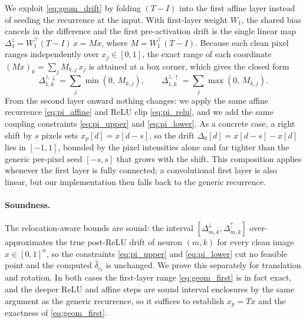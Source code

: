 \documentclass[11pt]{article}
\begin{document}
We exploit \eqref{eq:geom_drift} by folding $(T-I)$ into the first affine layer instead of seeding the recurrence at the input. With first-layer weight $W_1$, the shared bias cancels in the difference and the first pre-activation drift is the single linear map $\Delta^{z}_{1} = W_1^\top (T-I)\, x = M x$, where $M = W_1^\top (T-I)$. Because each clean pixel ranges independently over $x_j \in [0,1]$, the exact range of each coordinate $(Mx)_k = \sum_j M_{k,j}\, x_j$ is attained at a box corner, which gives the closed form
\begin{equation}
  \Delta^{z,\downarrow}_{1,k} = \textstyle\sum_j \min(0,\, M_{k,j}), \qquad
  \Delta^{z,\uparrow}_{1,k}   = \textstyle\sum_j \max(0,\, M_{k,j}).
  \label{eq:geom_first}
\end{equation}
From the second layer onward nothing changes: we apply the same affine recurrence \eqref{eq:pi_affine} and ReLU clip \eqref{eq:pi_relu}, and we add the same coupling constraints \eqref{eq:pi_upper} and \eqref{eq:pi_lower}. As a concrete case, a right shift by $s$ pixels sets $x_p[d] = x[d-s]$, so the drift $\Delta_0[d] = x[d-s] - x[d]$ lies in $[-1,1]$, bounded by the pixel intensities alone and far tighter than the generic per-pixel seed $[-s,s]$ that grows with the shift. This composition applies whenever the first layer is fully connected; a convolutional first layer is also linear, but our implementation then falls back to the generic recurrence.

\paragraph{Soundness.}
The relocation-aware bounds are sound: the interval $[\Delta^{\downarrow}_{m,k}, \Delta^{\uparrow}_{m,k}]$ over-approximates the true post-ReLU drift of neuron $(m,k)$ for every clean image $x \in [0,1]^n$, so the constraints \eqref{eq:pi_upper} and \eqref{eq:pi_lower} cut no feasible point and the computed $\hat{\delta}_{c_t}$ is unchanged. We prove this separately for translation and rotation. In both cases the first-layer range \eqref{eq:geom_first} is in fact exact, and the deeper ReLU and affine steps are sound interval enclosures by the same argument as the generic recurrence, so it suffices to establish $x_p = T x$ and the exactness of \eqref{eq:geom_first}.
\end{document}
